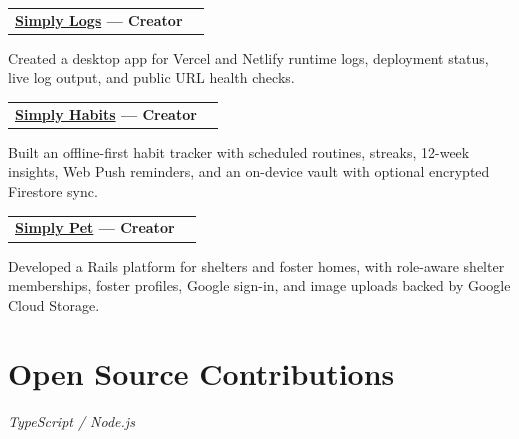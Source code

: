 \documentclass[10.5pt,a4paper]{article}
\makeatletter
\newcommand{\jobtitle}[2]{%
  \noindent
  \begin{tabularx}{\linewidth}{@{}X r@{}}
    \textbf{#1} & \textit{\small\color{muted}#2}
  \end{tabularx}\vspace{1pt}%
}
\makeatother
\begin{document}
\jobtitle{\href{https://simply-logs.netlify.app}{Simply Logs} \textnormal{---} Creator}{}
Created a desktop app for Vercel and Netlify runtime logs, deployment status, live log output,
and public URL health checks.

\jobtitle{\href{https://simply-habits.vercel.app}{Simply Habits} \textnormal{---} Creator}{}
Built an offline-first habit tracker with scheduled routines, streaks, 12-week insights, Web Push
reminders, and an on-device vault with optional encrypted Firestore sync.

\jobtitle{\href{https://simply-pet.onrender.com}{Simply Pet} \textnormal{---} Creator}{}
Developed a Rails platform for shelters and foster homes, with role-aware shelter memberships,
foster profiles, Google sign-in, and image uploads backed by Google Cloud Storage.

\section{Open Source Contributions}

\noindent\textit{\small\color{muted}TypeScript / Node.js}\vspace{3pt}
\end{document}
